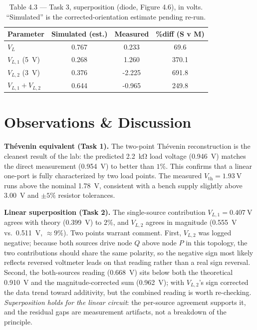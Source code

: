 \documentclass[11pt]{article}
\newcommand{\todo}[1]{\par\noindent{\color{red}\textbf{[CONFIRM: #1]}}\par}
\begin{document}
\begin{table}[H]
    \centering
    \caption{Table 4.3 --- Task 3, superposition (diode, Figure 4.6), in volts. ``Simulated'' is the corrected-orientation estimate pending re-run.}
    \label{tab:t43}
    \begin{tabular}{l S[table-format=1.3] S[table-format=-1.3] S[table-format=3.1]}
        \toprule
        Parameter & {Simulated (est.)} & {Measured} & {\%diff (S v M)} \\
        \midrule
        $V_L$              & 0.767 & 0.233  & 69.6  \\
        $V_{L,1}$ (\SI{5}{\volt}) & 0.268 & 1.260  & 370.1 \\
        $V_{L,2}$ (\SI{3}{\volt}) & 0.376 & -2.225 & 691.8 \\
        $V_{L,1}+V_{L,2}$  & 0.644 & -0.965 & 249.8 \\
        \bottomrule
    \end{tabular}
\end{table}

\todo{Verify three measured cells against your lab notebook: the
$V_{L,2}=\SI{-0.555}{\volt}$ sign (Table 4.2), the $V_{L,1}=\SI{1.260}{\volt}$
reading (Table 4.3, logged as 1260), and whether the both-source Table 4.2 reading
(\SI{0.668}{\volt}) was taken with both supplies at full value.}

\section*{Observations \& Discussion}

\textbf{Th\'evenin equivalent (Task 1).} The two-point Th\'evenin reconstruction
is the cleanest result of the lab: the predicted \SI{2.2}{\kilo\ohm} load voltage
(\SI{0.946}{\volt}) matches the direct measurement (\SI{0.954}{\volt}) to better
than $1\%$. This confirms that a linear one-port is fully characterized by two
load points. The measured $V_{\text{th}}=\SI{1.93}{\volt}$ runs above the nominal
\SI{1.78}{\volt}, consistent with a bench supply slightly above \SI{3.00}{\volt}
and $\pm5\%$ resistor tolerances.

\textbf{Linear superposition (Task 2).} The single-source contribution
$V_{L,1}=\SI{0.407}{\volt}$ agrees with theory (\SI{0.399}{\volt}) to $2\%$, and
$V_{L,2}$ agrees in magnitude (\SI{0.555}{\volt} vs.\ \SI{0.511}{\volt},
$\approx9\%$). Two points warrant comment. First, $V_{L,2}$ was logged negative;
because both sources drive node $Q$ above node $P$ in this topology, the two
contributions should share the same polarity, so the negative sign most likely
reflects reversed voltmeter leads on that reading rather than a real sign
reversal. Second, the both-sources reading (\SI{0.668}{\volt}) sits below both the
theoretical \SI{0.910}{\volt} and the magnitude-corrected sum (\SI{0.962}{\volt});
with $V_{L,2}$'s sign corrected the data trend toward additivity, but the combined
reading is worth re-checking. \emph{Superposition holds for the linear circuit}:
the per-source agreement supports it, and the residual gaps are measurement
artifacts, not a breakdown of the principle.
\end{document}
